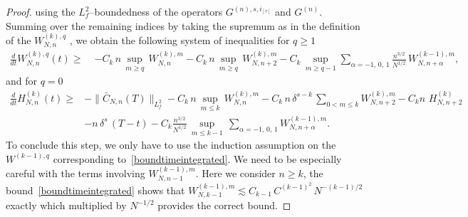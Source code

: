 \documentclass[pdflatex,sn-mathphys-num]{sn-jnl}
\theoremstyle{thmstyleone}%
\theoremstyle{thmstyletwo}%
\theoremstyle{thmstylethree}%
\begin{document}
\begin{proof}
using the $L^2_f$--boundedness of the operators $G^{(n),s,i_{[r]}}$ and $G^{(n)}$. Summing over the remaining indices by taking the supremum as in the definition of the $W^{(k),q}_{N,n}$ , we obtain the following system of inequalities for $q\geq 1$
\[
\begin{aligned}
\frac{d}{dt} W^{(k),q}_{N,n}(t)
\geq\;&
-C_k\, n\,\sup_{m\geq q}\,W^{(k),m}_{N,n}-C_k\, n\,\sup_{m\geq q}\,W^{(k),m}_{N,n+2}-C_k\,\sup_{m\geq q-1} \sum_{\alpha=-1,\,0,\,1}\frac{n^{3/2}} {N^{1/2}}\,W^{(k-1),m}_{N,n+\alpha},
\end{aligned}
\]
and for $q=0$
\[
\begin{aligned}
\frac{d}{dt} H^{(k)}_{N,n}(t)\geq &-\|\bar{C}_{N,n}(T) \|_{L^2_f} -C_k\,n\,\sup_{m\leq k}\,W^{(k),m}_{N,n}-C_k\,n\,\delta^{s-k}\,\sum_{0<m\leq k} W^{(k),m}_{N,n+2}-C_kn\,\,H^{(k)}_{N,n+2}\\
&-n\,\delta^s\,(T-t)-C_k\frac{n^{3/2}}{N^{1/2}}\,\sup_{m\leq k-1} \,\sum_{\alpha=-1,\,0,\,1} W^{(k-1),m}_{N,n+\alpha}.
\end{aligned}
\]
To conclude this step, we only have to use the induction assumption on the $W^{(k-1),q}$ corresponding to~\eqref{boundtimeintegrated}. We need to be especially careful with the terms involving $W^{(k-1),m}_{N,n-1}$. Here we consider $n\geq k$, the bound~\eqref{boundtimeintegrated} shows that $W^{(k-1),m}_{N,k-1}\lesssim C_{k-1}\,C^{(k-1)^2}\,N^{-(k-1)/2}$ exactly which multiplied by $N^{-1/2}$ provides the correct bound.


\end{proof}
\end{document}
